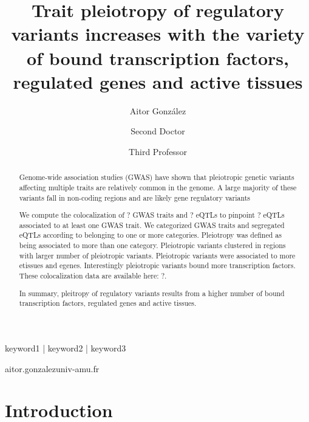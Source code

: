 
\title{Trait pleiotropy of regulatory variants increases with the variety of bound transcription factors, regulated genes and active tissues}

\author[1,\Letter]{Aitor González }
\author[2]{Second Doctor }
\author[1]{Third Professor }
\date{}

\maketitle

\begin{abstract}
Genome-wide association studies (GWAS) have shown that pleiotropic genetic variants affecting multiple traits are relatively common in the genome.
A large majority of these variants fall in non-coding regions and are likely gene regulatory variants

We compute the colocalization of ? GWAS traits and ? eQTLs to pinpoint ? eQTLs associated to at least one GWAS trait.
We categorized GWAS traits and segregated eQTLs according to belonging to one or more categories.
Pleiotropy was defined as being associated to more than one category.
Pleiotropic variants clustered in regions with larger number of pleiotropic variants.
Pleiotropic variants were associated to more etissues and egenes.
Interestingly pleiotropic variants bound more transcription factors.
These colocalization data are available here: ?.

In summary, pleitropy of regulatory variants results from a higher number of bound transcription factors, regulated genes and active tissues.


\lipsum[1][1]
\end{abstract}

\begin{keywords}
keyword1 | keyword2 | keyword3
\end{keywords}

\begin{corrauthor}
aitor.gonzalez\at univ-amu.fr
\end{corrauthor}

\section*{Introduction}\label{sec:introduction}

